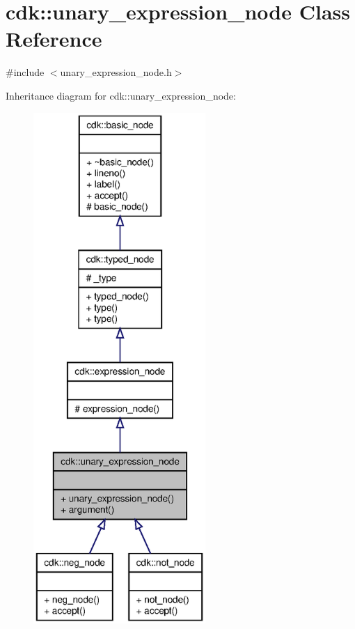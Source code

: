 \section{cdk\+:\+:unary\+\_\+expression\+\_\+node Class Reference}
\label{classcdk_1_1unary__expression__node}


{\ttfamily \#include $<$unary\+\_\+expression\+\_\+node.\+h$>$}



Inheritance diagram for cdk\+:\+:unary\+\_\+expression\+\_\+node\+:
\nopagebreak
\begin{figure}[H]
\begin{center}
\leavevmode
\includegraphics[height=550pt]{classcdk_1_1unary__expression__node__inherit__graph}
\end{center}
\end{figure}


